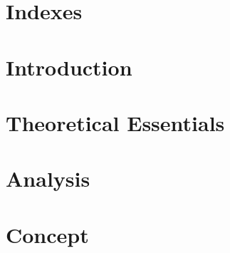 \documentclass[13pt,pdftex,a4paper]{scrreprt}
\begin{document}


\renewcommand\chaptername{}
\renewcommand\thechapter{}

\pagestyle{plain}
\newpage

%

%

\newpage




\tableofcontents

\pagestyle{fancyStyle}

\chapter*{Indexes}


\listoffigures
\listoftables
\lstlistoflistings

\newpage
\renewcommand\chaptername{Chapter}
\renewcommand\thechapter{\arabic{chapter}}


\chapter{Introduction}
\label{introduction}


\chapter{Theoretical Essentials}
\label{preliminaries}


\chapter{Analysis}
\label{analysis}


\chapter{Concept}
\label{concept}

\end{document}
